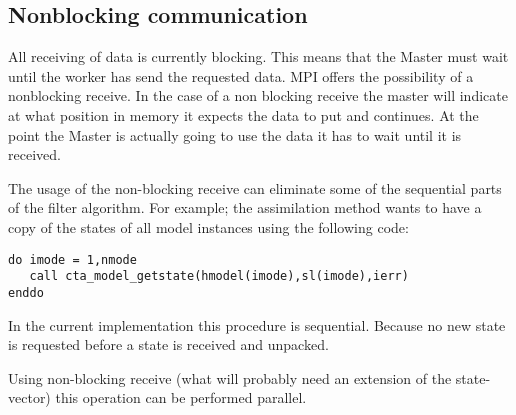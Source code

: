 \documentclass[a4paper,12pt]{article}
\newcommand{\styles}{../../styles}
\begin{document}
\subsection{Nonblocking communication} \label{Sec:Nonblocking}
All receiving of data is currently blocking. This means that the Master
must wait until the worker has send the requested data. MPI offers the
possibility of a nonblocking receive. In the case of a non blocking receive
the master will indicate at what position in memory it expects the data to
put and continues. At the point the Master is actually going to use the
data it has to wait until it is received. 

The usage of the non-blocking receive can eliminate some of the sequential
parts of the filter algorithm. For example; the assimilation method wants
to have a copy of the states of all model instances using the following
code:

\begin{verbatim}
do imode = 1,nmode
   call cta_model_getstate(hmodel(imode),sl(imode),ierr)
enddo
\end{verbatim}
In the current implementation this procedure is sequential. Because no new
state is requested before a state is received and unpacked.

Using non-blocking receive (what will probably need an extension of the
state-vector) this operation can be performed parallel.




\end{document}
